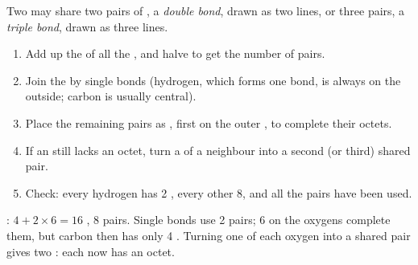 \begin{definition}\label{def:g10:lewis-and-shape:multiple-bond}
Two  may share two pairs of , a \emph{double
bond}, drawn as two lines, or three pairs, a
\emph{triple bond}, drawn as three lines.
\end{definition}

\begin{method}\label{met:g10:lewis-and-shape:draw}
\begin{enumerate}
  \item Add up the  of all the , and halve to get
        the number of pairs.
  \item Join the  by single bonds (hydrogen, which forms one bond,
        is always on the outside; carbon is usually central).
  \item Place the remaining pairs as , first on the outer ,
        to complete their octets.
  \item If an  still lacks an octet, turn a  of a neighbour
        into a second (or third) shared pair.
  \item Check: every hydrogen has 2 , every other  8, and
        all the pairs have been used.
\end{enumerate}
\end{method}

\begin{example}\label{ex:g10:lewis-and-shape:co2}
: $4 + 2 \times 6 = 16$ , 8 pairs. Single bonds
 use 2 pairs; 6  on the oxygens complete them, but
carbon then has only 4 . Turning one  of each oxygen
into a shared pair gives two : each  now has an octet.
\end{example}

